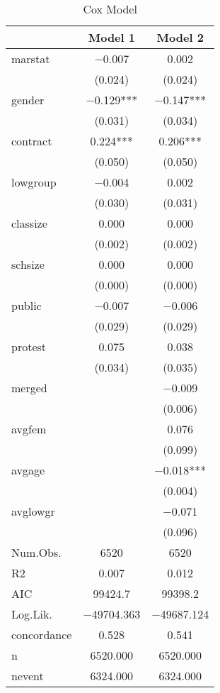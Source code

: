 \documentclass[
]{article}
\begin{document}
\begin{table}[!h]

\caption{\label{tab:unnamed-chunk-22}Cox Model}
\centering
\fontsize{8}{10}\selectfont
\begin{tabular}[t]{lcc}
\toprule
  & Model 1 & Model 2\\
\midrule
marstat & \num{-0.007} & \num{0.002}\\
 & (\num{0.024}) & (\num{0.024})\\
gender & \num{-0.129}*** & \num{-0.147}***\\
 & (\num{0.031}) & (\num{0.034})\\
contract & \num{0.224}*** & \num{0.206}***\\
 & (\num{0.050}) & (\num{0.050})\\
lowgroup & \num{-0.004} & \num{0.002}\\
 & (\num{0.030}) & (\num{0.031})\\
classize & \num{0.000} & \num{0.000}\\
 & (\num{0.002}) & (\num{0.002})\\
schsize & \num{0.000} & \num{0.000}\\
 & (\num{0.000}) & (\num{0.000})\\
public & \num{-0.007} & \num{-0.006}\\
 & (\num{0.029}) & (\num{0.029})\\
protest & \num{0.075} & \num{0.038}\\
 & (\num{0.034}) & (\num{0.035})\\
merged &  & \num{-0.009}\\
 &  & (\num{0.006})\\
avgfem &  & \num{0.076}\\
 &  & (\num{0.099})\\
avgage &  & \num{-0.018}***\\
 &  & (\num{0.004})\\
avglowgr &  & \num{-0.071}\\
 &  & (\num{0.096})\\
\midrule
Num.Obs. & \num{6520} & \num{6520}\\
R2 & \num{0.007} & \num{0.012}\\
AIC & \num{99424.7} & \num{99398.2}\\
Log.Lik. & \num{-49704.363} & \num{-49687.124}\\
concordance & \num{0.528} & \num{0.541}\\
n & \num{6520.000} & \num{6520.000}\\
nevent & \num{6324.000} & \num{6324.000}\\

\end{tabular}
\end{table}
\end{document}
